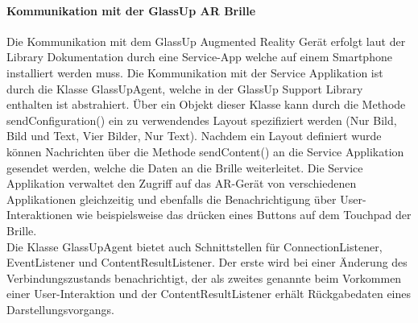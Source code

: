 \paragraph{Kommunikation mit der GlassUp AR Brille}
Die Kommunikation mit dem GlassUp Augmented Reality Gerät erfolgt laut der Library Dokumentation durch eine Service-App welche auf einem Smartphone installiert werden muss\cite{glassup_devguide_2015}. Die Kommunikation mit der Service Applikation ist durch die Klasse GlassUpAgent, welche in der GlassUp Support Library enthalten ist abstrahiert\cite{glassup_devguide_2015}. Über ein Objekt dieser Klasse kann durch die Methode sendConfiguration() ein zu verwendendes Layout spezifiziert werden (Nur Bild, Bild und Text, Vier Bilder, Nur Text). Nachdem ein Layout definiert wurde können Nachrichten über die Methode sendContent() an die Service Applikation gesendet werden, welche die Daten an die Brille weiterleitet. Die Service Applikation verwaltet den Zugriff auf das AR-Gerät von verschiedenen Applikationen gleichzeitig und ebenfalls die Benachrichtigung über User-Interaktionen wie beispielsweise das drücken eines Buttons auf dem Touchpad der Brille.\\
Die Klasse GlassUpAgent bietet auch Schnittstellen für ConnectionListener, EventListener und ContentResultListener.
Der erste wird bei einer Änderung des Verbindungszustands benachrichtigt, der als zweites genannte beim Vorkommen einer User-Interaktion und der ContentResultListener erhält Rückgabedaten eines Darstellungsvorgangs.

